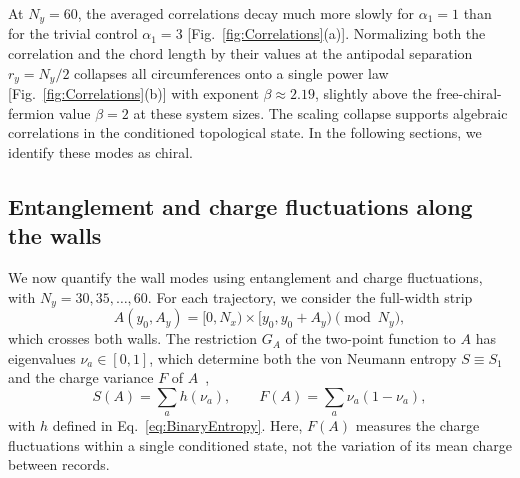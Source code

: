 \documentclass[aps,prb,10pt,twocolumn,superscriptaddress,longbibliography,floatfix]{revtex4-2}
\newcommand{\newtext}[1]{{\color{blue}#1}}
\begin{document}
\newtext{At $N_y=60$, the averaged correlations decay much more slowly for $\alpha_1=1$ than for the trivial control $\alpha_1=3$ [Fig.~\ref{fig:Correlations}(a)].} \newtext{Normalizing both the correlation and the chord length by their values at the antipodal separation $r_y=N_y/2$ collapses all circumferences onto a single power law [Fig.~\ref{fig:Correlations}(b)] with exponent $\beta\approx2.19$, slightly above the free-chiral-fermion value $\beta=2$ at these system sizes.} \newtext{The scaling collapse supports algebraic correlations in the conditioned topological state.} In the following sections, we identify these modes as chiral.

\subsection{Entanglement and charge fluctuations along the walls}
\label{sec:Entanglement}

{\color{blue}
We now quantify the wall modes using entanglement and charge fluctuations, with $N_y=30,35,\ldots,60$. For each trajectory, we consider the full-width strip
\begin{equation}
    A(y_0,A_y)=[0,N_x)\times[y_0,y_0+A_y)\pmod{N_y},
    \label{eq:Strip}
\end{equation}
which crosses both walls. The restriction $G_A$ of the two-point function to $A$ has eigenvalues $\nu_a\in[0,1]$, which determine both the von Neumann entropy $S\equiv S_1$ and the charge variance $F$ of $A$~\cite{KlichLevitov2009,SongFlindtRachel2011},
\begin{equation}
    S(A)=\sum_a h(\nu_a),
    \qquad
    F(A)=\sum_a\nu_a(1-\nu_a),
    \label{eq:EntropyVariance}
\end{equation}
\newtext{with $h$ defined in Eq.~\eqref{eq:BinaryEntropy}.}
Here, $F(A)$ measures the charge fluctuations within a single conditioned state, not the variation of its mean charge between records.
}
\end{document}
